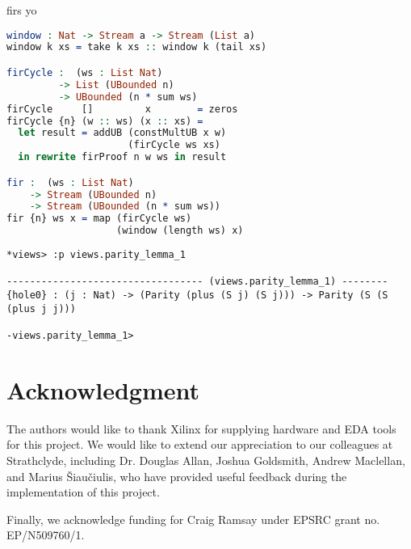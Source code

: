 \documentclass[conference]{IEEEtran}
\begin{document}
\begin{codefig}[h]
  \caption{firs yo}
\begin{lstlisting}[language=idris]
window : Nat -> Stream a -> Stream (List a)
window k xs = take k xs :: window k (tail xs) 

firCycle :  (ws : List Nat)
         -> List (UBounded n)
         -> UBounded (n * sum ws)
firCycle     []         x        = zeros
firCycle {n} (w :: ws) (x :: xs) =
  let result = addUB (constMultUB x w)
                     (firCycle ws xs)
  in rewrite firProof n w ws in result

fir :  (ws : List Nat)
    -> Stream (UBounded n)
    -> Stream (UBounded (n * sum ws))
fir {n} ws x = map (firCycle ws)
                   (window (length ws) x)
\end{lstlisting}
\begin{lstlisting}[style=stdout]
*views> :p views.parity_lemma_1 

---------------------------------- (views.parity_lemma_1) --------
{hole0} : (j : Nat) -> (Parity (plus (S j) (S j))) -> Parity (S (S (plus j j)))

-views.parity_lemma_1>  
\end{lstlisting}
\label{code:step}
\end{codefig}

\section*{Acknowledgment}

The authors would like to thank Xilinx for supplying hardware and EDA tools for
this project. We would like to extend our appreciation to our colleagues at
Strathclyde, including Dr. Douglas Allan, Joshua Goldsmith, Andrew Maclellan,
and Marius Šiaučiulis, who have provided useful feedback during the
implementation of this project.

Finally, we acknowledge funding for Craig Ramsay under EPSRC grant no.
EP/N509760/1.


 
\end{document}
